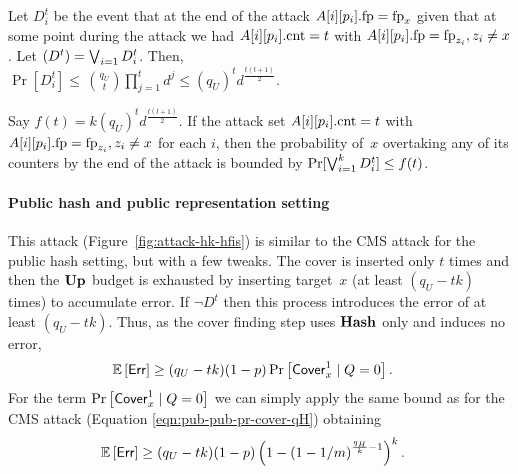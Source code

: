 Let $D_i^t$ be the event that at the end of the attack $A[i][p_i].\textup{fp} = \textup{fp}_x$ given that at some point during the attack we had $A[i][p_i].\textup{cnt} = t$ with $A[i][p_i].\textup{fp} = \textup{fp}_{z_i}, z_i \neq x$. Let $\left(D^t\right)= \bigvee_{i=1} D^t_i$. Then,\\ 
$
	\Pr[D_i^t] {\leq}\, {q_U \choose t}  \prod_{j=1}^{t} d^{j} 
	\leq \left(q_U\right)^t  d^{\frac{t(t+1)}{2}}.
$

Say $f(t) = k  \left(q_U\right)^t  d^{\frac{t(t+1)}{2}}$.
If the attack set $A[i][p_i].\textup{cnt} = t$ with $A[i][p_i].\textup{fp} = \textup{fp}_{z_i}, z_i \neq x$ for each $i$, then the probability of~$x$ overtaking any of its counters by the end of the attack is bounded by 
$\Pr[\bigvee_{i=1}^k D_i^t] \leq f(t)$.

\paragraph{Public hash and public representation setting}
This attack (Figure~\ref{fig:attack-hk-hfis}) is similar to the CMS attack for the public hash setting, but with a few tweaks. The cover is inserted only $t$ times and then the $\textup{\textbf{Up}}\hspace{0.5pt}$ budget is exhausted by inserting  target~$x$ (at least $(q_U - t k)$ times) to accumulate error. If $\lnot D^t$ then this process introduces the error of at least $(q_U - t k)$.  
Thus, as the cover finding step uses $\textup{\textbf{Hash}}\hspace{0.5pt}$ only and induces no error,
\begin{align*}
	\mathbb{E}&\left[\mathsf{Err}\right]\geq (q_U - t k)  (1-p)  \Pr\left[\mathsf{Cover}^{1}_{x} \mid Q = 0\right].
\end{align*}
For the term $\Pr\left[\mathsf{Cover}^{1}_{x} \mid Q = 0\right]$ we can simply apply the same bound as for the CMS attack (Equation \eqref{eqn:pub-pub-pr-cover-qH}) obtaining
\begin{align*}
	\mathbb{E}&\left[\mathsf{Err}\right]\geq (q_U - t k)  (1-p)  \left(1 - \left(1 - 1/m\right)^{\frac{q_H}{k}-1}\right)^{k}.
\end{align*}

